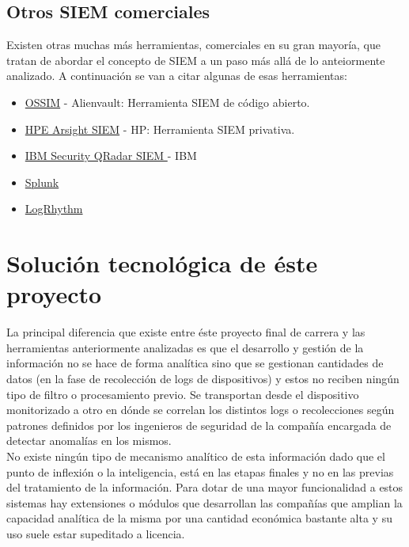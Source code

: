 \subsection{Otros SIEM comerciales}

Existen otras muchas más herramientas, comerciales en su gran mayoría, que tratan de abordar el concepto de SIEM a un paso más allá de lo anteiormente analizado. A continuación se van a citar algunas de esas herramientas:

\begin{itemize}
\item \href{https://www.alienvault.com/products/ossim}{OSSIM} - Alienvault: Herramienta SIEM de código abierto.
\item \href{http://www8.hp.com/es/es/software-solutions/siem-security-information-event-management/}{HPE Arsight SIEM} - HP: Herramienta SIEM privativa.
\item \href{http://www-03.ibm.com/software/products/es/qradar-siem}{IBM Security QRadar SIEM } - IBM
\item \href{http://www.splunk.com/es\_es}{Splunk}
\item \href{https://logrhythm.com/es/}{LogRhythm}
\end{itemize}

\section{Solución tecnológica de éste proyecto}

La principal diferencia que existe entre éste proyecto final de carrera y las herramientas anteriormente analizadas es que el desarrollo y gestión de la información no se hace de forma analítica sino que se gestionan cantidades de datos (en la fase de recolección de logs de dispositivos) y estos no reciben ningún tipo de filtro o procesamiento previo. Se transportan desde el dispositivo monitorizado a otro en dónde se correlan los distintos logs o recolecciones según patrones definidos por los ingenieros de seguridad de la compañía encargada de detectar anomalías en los mismos. \\

No existe ningún tipo de mecanismo analítico de esta información dado que el punto de inflexión o la inteligencia, está en las etapas finales y no en las previas del tratamiento de la información. Para dotar de una mayor funcionalidad a estos sistemas hay extensiones o módulos que desarrollan las compañías que amplian la capacidad analítica de la misma por una cantidad económica bastante alta y su uso suele estar supeditado a licencia. \\

